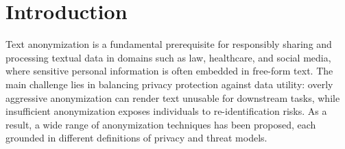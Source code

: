 \documentclass[10pt, a4paper]{article}
\begin{document}




\section{Introduction}

Text anonymization is a fundamental prerequisite for responsibly sharing and processing textual data in domains such as law, healthcare, and social media, where sensitive personal information is often embedded in free-form text. The main challenge lies in balancing privacy protection against data utility: overly aggressive anonymization can render text unusable for downstream tasks, while insufficient anonymization exposes individuals to re-identification risks. As a result, a wide range of anonymization techniques has been proposed, each grounded in different definitions of privacy and threat models.
\end{document}
